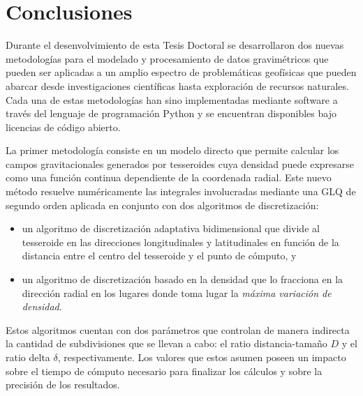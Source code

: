 \chapter{Conclusiones}

Durante el desenvolvimiento de esta Tesis Doctoral se desarrollaron dos nuevas
metodologías para el modelado y procesamiento de datos gravimétricos que pueden
ser aplicadas a un amplio espectro de problemáticas geofísicas que pueden
abarcar desde investigaciones científicas hasta exploración de recursos
naturales.
Cada una de estas metodologías han sino implementadas mediante software
a través del lenguaje de programación Python y se encuentran disponibles bajo
licencias de código abierto.

\vspace{1em}

La primer metodología consiste en un modelo directo que permite calcular los
campos gravitacionales generados por tesseroides cuya densidad puede expresarse
como una función continua dependiente de la coordenada radial.
Este nuevo método resuelve numéricamente las integrales involucradas mediante
una \acl{GLQ} de segundo orden aplicada en conjunto con dos algoritmos de
discretización:

\begin{itemize}
    \item un algoritmo de discretización adaptativa bidimensional que divide al
        tesseroide en las direcciones longitudinales y latitudinales en función
        de la distancia entre el centro del tesseroide y el punto de cómputo, y
    \item  un algoritmo de discretización basado en la densidad que lo
        fracciona en la dirección radial en los lugares donde toma lugar la
        \emph{máxima variación de densidad}.
\end{itemize}

Estos algoritmos cuentan con dos parámetros que controlan de manera indirecta
la cantidad de subdivisiones que se llevan a cabo: el ratio distancia-tamaño
$D$ y el ratio delta $\delta$, respectivamente.
Los valores que estos asumen poseen un impacto sobre el tiempo de cómputo
necesario para finalizar los cálculos y sobre la precisión de los resultados.


